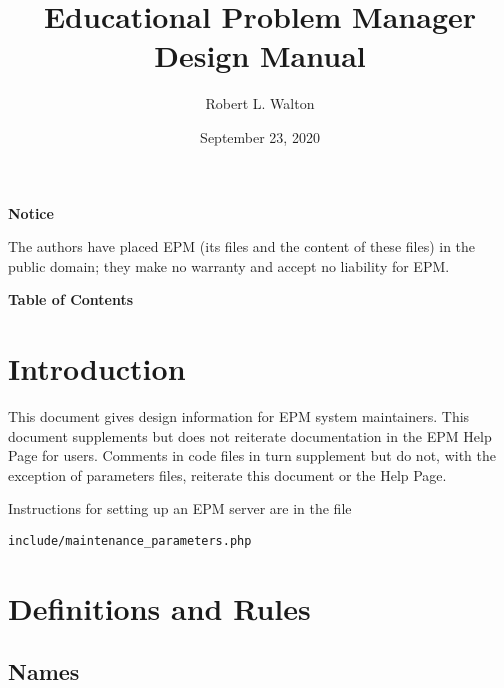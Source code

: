 \documentclass[12pt]{article}
\makeatletter
\renewcommand\tableofcontents{%
    \begin{list}{}%
	     {\setlength{\itemsep}{0in}%
	      \setlength{\topsep}{0in}%
	      \setlength{\parsep}{1ex}%
	      \setlength{\labelwidth}{0in}%
	      \setlength{\baselineskip}{1.5ex}%
	      \setlength{\leftmargin}{0.8in}%
	      \setlength{\rightmargin}{0.8in}}%
    \item\@starttoc{toc}%
    \end{list}}
\makeatother
\begin{document}
        
\title{Educational Problem Manager\\
Design Manual}

\author{Robert L. Walton}

\date{September 23, 2020}
 
\maketitle

\begin{center}
{\large \bf Notice}
\\[2ex]
\begin{minipage}{5.5in}
The authors have placed EPM (its files and the content of these files) in
the public domain; they make no warranty and accept
no liability for EPM.
\end{minipage}
\end{center}
\begin{center}
\large \bf Table of Contents
\end{center}

\bigskip

\tableofcontents 

\newpage

\section{Introduction}

This document gives design information for EPM system maintainers.
This document supplements but does not reiterate
documentation in the EPM Help Page for
users.  Comments in code files in turn supplement but do not, with
the exception of parameters files,
reiterate this document or the Help Page.

Instructions for setting up an EPM server are in the file
\begin{center}
{\tt include/maintenance\_parameters.php}
\end{center}

\section{Definitions and Rules}

\subsection{Names}\label{NAMES}
\end{document}

